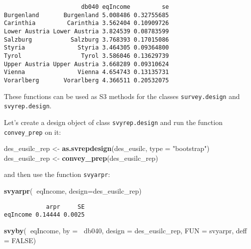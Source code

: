 \documentclass[]{book}
\newenvironment{Shaded}{\begin{snugshade}}{\end{snugshade}}
\newcommand{\DataTypeTok}[1]{\textcolor[rgb]{0.13,0.29,0.53}{#1}}
\newcommand{\KeywordTok}[1]{\textcolor[rgb]{0.13,0.29,0.53}{\textbf{#1}}}
\newcommand{\NormalTok}[1]{#1}
\newcommand{\OperatorTok}[1]{\textcolor[rgb]{0.81,0.36,0.00}{\textbf{#1}}}
\newcommand{\OtherTok}[1]{\textcolor[rgb]{0.56,0.35,0.01}{#1}}
\newcommand{\StringTok}[1]{\textcolor[rgb]{0.31,0.60,0.02}{#1}}
\begin{document}
\begin{verbatim}
                      db040 eqIncome         se
Burgenland       Burgenland 5.008486 0.32755685
Carinthia         Carinthia 3.562404 0.10909726
Lower Austria Lower Austria 3.824539 0.08783599
Salzburg           Salzburg 3.768393 0.17015086
Styria               Styria 3.464305 0.09364800
Tyrol                 Tyrol 3.586046 0.13629739
Upper Austria Upper Austria 3.668289 0.09310624
Vienna               Vienna 4.654743 0.13135731
Vorarlberg       Vorarlberg 4.366511 0.20532075
\end{verbatim}

These functions can be used as S3 methods for the classes \texttt{survey.design} and \texttt{svyrep.design}.

Let's create a design object of class \texttt{svyrep.design} and run the function \texttt{convey\_prep} on it:

\begin{Shaded}
\begin{Highlighting}[]
\NormalTok{des_eusilc_rep <-}\StringTok{ }\KeywordTok{as.svrepdesign}\NormalTok{(des_eusilc, }\DataTypeTok{type =} \StringTok{"bootstrap"}\NormalTok{)}
\NormalTok{des_eusilc_rep <-}\StringTok{ }\KeywordTok{convey_prep}\NormalTok{(des_eusilc_rep) }
\end{Highlighting}
\end{Shaded}

and then use the function \texttt{svyarpr}:

\begin{Shaded}
\begin{Highlighting}[]
\KeywordTok{svyarpr}\NormalTok{(}\OperatorTok{~}\NormalTok{eqIncome, }\DataTypeTok{design=}\NormalTok{des_eusilc_rep)}
\end{Highlighting}
\end{Shaded}

\begin{verbatim}
            arpr     SE
eqIncome 0.14444 0.0025
\end{verbatim}

\begin{Shaded}
\begin{Highlighting}[]
\KeywordTok{svyby}\NormalTok{(}\OperatorTok{~}\NormalTok{eqIncome, }\DataTypeTok{by =} \OperatorTok{~}\NormalTok{db040, }\DataTypeTok{design =}\NormalTok{ des_eusilc_rep, }\DataTypeTok{FUN =}\NormalTok{ svyarpr, }\DataTypeTok{deff =} \OtherTok{FALSE}\NormalTok{)}
\end{Highlighting}
\end{Shaded}
\end{document}
